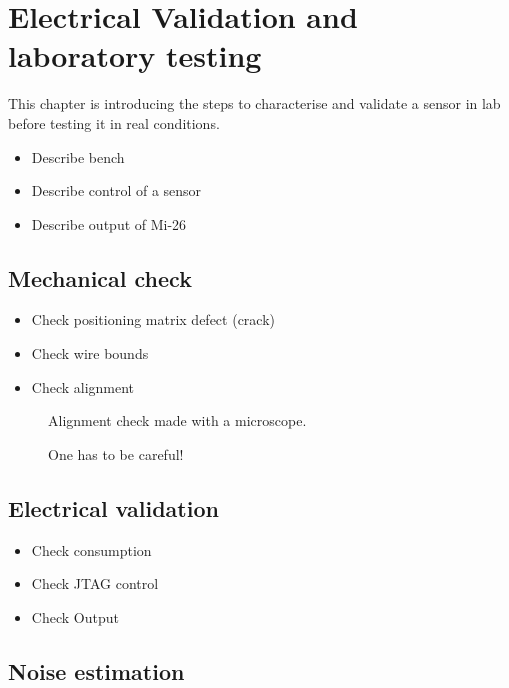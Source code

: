 \chapter{Electrical Validation and laboratory testing}
\label{chap:labTests}


  This chapter is introducing the steps to characterise and validate a sensor in lab before testing it in real conditions.

  \begin{itemize}
    \item Describe bench
    \item Describe control of a sensor
    \item Describe output of Mi-26
  \end{itemize}

\section{Mechanical check}
  \begin{itemize}
    \item Check positioning matrix defect (crack)
    \item Check wire bounds
    \item Check alignment
  \end{itemize}

  \begin{figure}
    \caption{Alignment check made with a microscope.}
  \end{figure}

  \begin{figure}
    \caption{One has to be careful!}
  \end{figure}

\section{Electrical validation}

  \begin{itemize}
    \item Check consumption
    \item Check JTAG control
    \item Check Output
  \end{itemize}

\section{Noise estimation}

